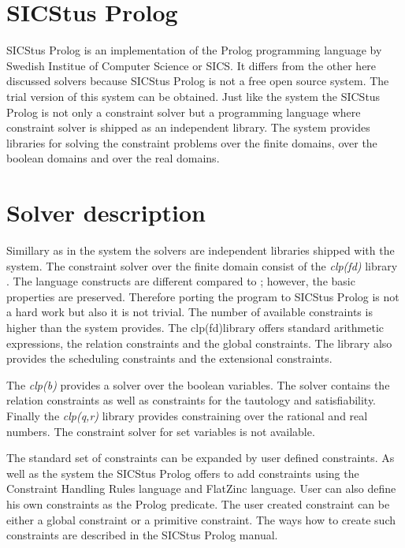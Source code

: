 \section{SICStus Prolog}

SICStus Prolog is an implementation of the Prolog programming language by Swedish
Institue of Computer Science or SICS. It differs from the other here discussed solvers 
because SICStus Prolog is not a free open source system. The trial version of this
system can be obtained. Just like the \eclipse system the SICStus Prolog is not only
a constraint solver but a programming language where constraint solver is shipped as 
an independent library. The system provides libraries for solving the constraint problems
over the finite domains, over the boolean domains and over the real domains.

\section{Solver description}
Simillary as in the \eclipse system the solvers are independent libraries shipped 
with the system. The constraint solver over the finite domain consist of the
{\em clp(fd)} library \cite{Carlsson97anopen-ended}. The language constructs are different
compared to \eclipse; however, the basic properties are preserved. Therefore porting
the \eclipse program to SICStus Prolog is not a hard work but also it is not trivial.
The number of available constraints is higher than the \eclipse system provides.
The clp(fd)library offers standard arithmetic expressions, the relation constraints
and the global constraints. The library also provides the scheduling constraints and 
the extensional constraints.

The {\em clp(b)} provides a solver over the boolean variables. The solver contains
the relation constraints as well as constraints for the tautology and satisfiability.
Finally the {\em clp(q,r)} library \cite{clpqr:opai} provides constraining over the 
rational and real numbers. The constraint solver for set variables is not available.

The standard set of constraints can be expanded by user defined constraints. As well as the
\eclipse system the SICStus Prolog offers to add constraints using the Constraint Handling
Rules language and FlatZinc language. User can also define his own constraints as the
Prolog predicate. The user created constraint can be either a global constraint or
a primitive constraint. The ways how to create such constraints are described in 
the SICStus Prolog manual.

